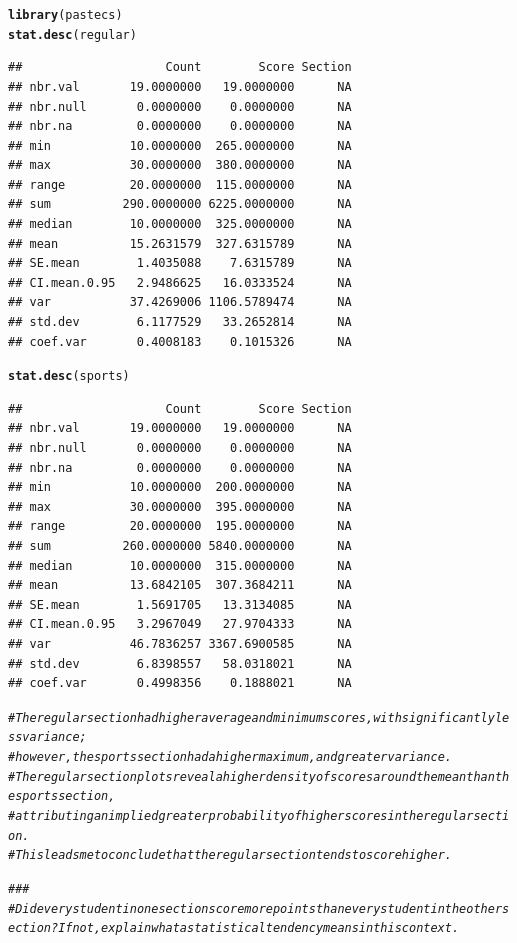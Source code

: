 \documentclass{article}\usepackage[]{graphicx}\usepackage[]{xcolor}
\makeatletter
\newcommand{\hlcom}[1]{\textcolor[rgb]{0.678,0.584,0.686}{\textit{#1}}}%
\newcommand{\hlstd}[1]{\textcolor[rgb]{0.345,0.345,0.345}{#1}}%
\newcommand{\hlkwd}[1]{\textcolor[rgb]{0.737,0.353,0.396}{\textbf{#1}}}%
\newenvironment{kframe}{%
 \def\at@end@of@kframe{}%
 \ifinner\ifhmode%
  \def\at@end@of@kframe{\end{minipage}}%
  \begin{minipage}{\columnwidth}%
 \fi\fi%
 \def\FrameCommand##1{\hskip\@totalleftmargin \hskip-\fboxsep
 \colorbox{shadecolor}{##1}\hskip-\fboxsep
     \hskip-\linewidth \hskip-\@totalleftmargin \hskip\columnwidth}%
 \MakeFramed {\advance\hsize-\width
   \@totalleftmargin\z@ \linewidth\hsize
   \@setminipage}}%
 {\par\unskip\endMakeFramed%
 \at@end@of@kframe}
\newenvironment{knitrout}{}{} %
\makeatother
\begin{document}
\begin{knitrout}
\begin{kframe}
\begin{alltt}
\hlkwd{library}\hlstd{(pastecs)}
\hlkwd{stat.desc}\hlstd{(regular)}
\end{alltt}
\begin{verbatim}
##                    Count        Score Section
## nbr.val       19.0000000   19.0000000      NA
## nbr.null       0.0000000    0.0000000      NA
## nbr.na         0.0000000    0.0000000      NA
## min           10.0000000  265.0000000      NA
## max           30.0000000  380.0000000      NA
## range         20.0000000  115.0000000      NA
## sum          290.0000000 6225.0000000      NA
## median        10.0000000  325.0000000      NA
## mean          15.2631579  327.6315789      NA
## SE.mean        1.4035088    7.6315789      NA
## CI.mean.0.95   2.9486625   16.0333524      NA
## var           37.4269006 1106.5789474      NA
## std.dev        6.1177529   33.2652814      NA
## coef.var       0.4008183    0.1015326      NA
\end{verbatim}
\begin{alltt}
\hlkwd{stat.desc}\hlstd{(sports)}
\end{alltt}
\begin{verbatim}
##                    Count        Score Section
## nbr.val       19.0000000   19.0000000      NA
## nbr.null       0.0000000    0.0000000      NA
## nbr.na         0.0000000    0.0000000      NA
## min           10.0000000  200.0000000      NA
## max           30.0000000  395.0000000      NA
## range         20.0000000  195.0000000      NA
## sum          260.0000000 5840.0000000      NA
## median        10.0000000  315.0000000      NA
## mean          13.6842105  307.3684211      NA
## SE.mean        1.5691705   13.3134085      NA
## CI.mean.0.95   3.2967049   27.9704333      NA
## var           46.7836257 3367.6900585      NA
## std.dev        6.8398557   58.0318021      NA
## coef.var       0.4998356    0.1888021      NA
\end{verbatim}
\begin{alltt}
  \hlcom{# The regular section had higher average and minimum scores, with significantly less variance;}
  \hlcom{# however, the sports section had a higher maximum, and greater variance.}
  \hlcom{# The regular section plots reveal a higher density of scores around the mean than the sports section,}
  \hlcom{# attributing an implied greater probability of higher scores in the regular section.}
  \hlcom{# This leads me to conclude that the regular section tends to score higher.}

\hlcom{###}
\hlcom{# Did every student in one section score more points than every student in the other section? If not, explain what a statistical tendency means in this context.}


\end{alltt}
\end{kframe}
\end{knitrout}
\end{document}
